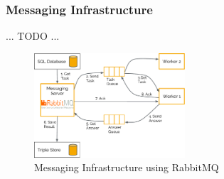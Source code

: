\subsubsection{Messaging Infrastructure}
\label{subsubsec_messaging_infrastructure}

... TODO ...

\begin{figure}[ht]
  \begin{center}
  \includegraphics[width=0.5\textwidth]{images/rabbit_mq.pdf}
  \end{center}
  \caption{Messaging Infrastructure using RabbitMQ}
  \label{fig_messaging_infrastructure}
\end{figure}